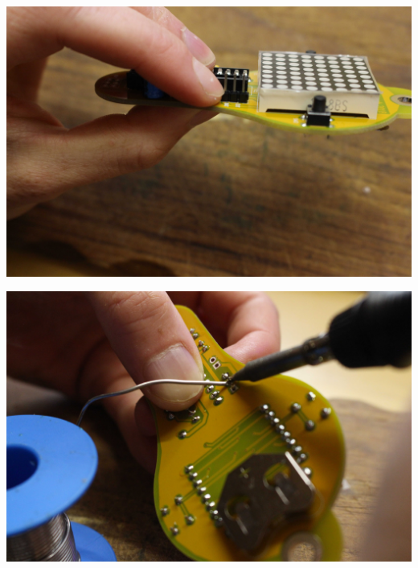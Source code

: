 \documentclass{article}
\begin{document}
\begin{minipage}[b]{0.5\textwidth}
	\includegraphics[width=\textwidth]{Bilder/IMG_5606.JPG}
	\label{fig:}
\end{minipage}
\begin{minipage}[b]{0.5\textwidth}
	\includegraphics[width=\textwidth]{Bilder/IMG_5608.JPG}
	\label{fig:}
\end{minipage}
\end{document}
